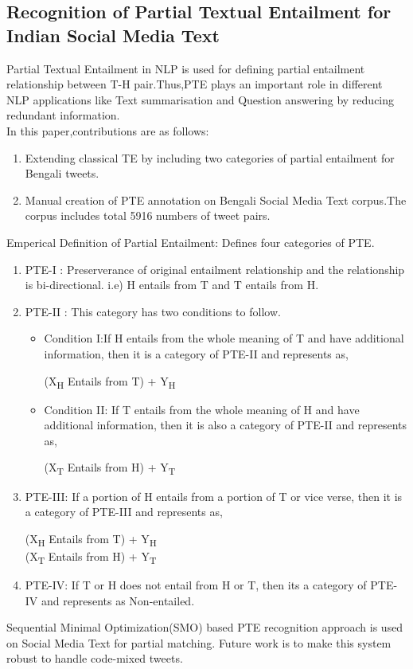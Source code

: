 \documentclass[12pt,a4paper]{article}
\begin{document}
 \subsection{Recognition of Partial Textual Entailment for Indian Social Media Text\cite{partialTESocial}}
 Partial Textual Entailment in NLP is used for defining partial entailment relationship between T-H pair.Thus,PTE plays an important role in different NLP applications like Text summarisation and Question answering by reducing redundant information.\\
 In this paper,contributions are as follows:
 \begin{enumerate}
 	\item Extending classical TE by including two categories of partial entailment for Bengali tweets.
 	\item Manual creation of PTE annotation on Bengali Social Media Text corpus.The corpus includes total 5916 numbers of tweet pairs.
 \end{enumerate}
Emperical Definition of Partial Entailment:
Defines four categories of PTE.
\begin{enumerate}
	\item PTE-I : Preserverance of original entailment relationship and the relationship is bi-directional.
	i.e) H entails from T and T entails from H.
	\item PTE-II : This category has two conditions to follow.
	\begin{itemize}
		\item Condition I:If H entails from the whole
		meaning of T and have additional information,
		then it is a category of PTE-II and represents
		as,\\ \begin{center}
			(X\textsubscript{H} Entails from T) + Y\textsubscript{H}
		\end{center}
		\item Condition II: If T entails from the whole
		meaning of H and have additional information,
		then it is also a category of PTE-II and
		represents as,
		\begin{center}
			(X\textsubscript{T} Entails from H) + Y\textsubscript{T}
		\end{center}
	\end{itemize} 
	\item PTE-III: If a portion of H entails from a portion
	of T or vice verse, then it is a category of
	PTE-III and represents as,\\
	\begin{center}
		(X\textsubscript{H} Entails from T) + Y\textsubscript{H}\\
		(X\textsubscript{T} Entails from H) + Y\textsubscript{T}
	\end{center}
\item PTE-IV: If T or H does not entail from H or T,
then its a category of PTE-IV and represents
as Non-entailed.
\end{enumerate}
Sequential Minimal Optimization(SMO) based PTE recognition approach is used on Social Media Text for partial matching.
Future work is to make this system robust to handle code-mixed tweets.
\end{document}
